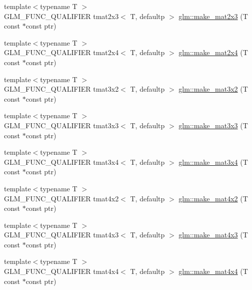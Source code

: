 \begin{DoxyCompactItemize}
\item 
{\footnotesize template$<$typename T $>$ }\\G\+L\+M\+\_\+\+F\+U\+N\+C\+\_\+\+Q\+U\+A\+L\+I\+F\+I\+ER tmat2x3$<$ T, defaultp $>$ \hyperlink{group__gtc__type__ptr_ga37988c6dd941f617cdfab86d54375fc1}{glm\+::make\+\_\+mat2x3} (T const $\ast$const ptr)
\item 
{\footnotesize template$<$typename T $>$ }\\G\+L\+M\+\_\+\+F\+U\+N\+C\+\_\+\+Q\+U\+A\+L\+I\+F\+I\+ER tmat2x4$<$ T, defaultp $>$ \hyperlink{group__gtc__type__ptr_ga6dfb2ac10859b0cc8e3893ea84fa95b5}{glm\+::make\+\_\+mat2x4} (T const $\ast$const ptr)
\item 
{\footnotesize template$<$typename T $>$ }\\G\+L\+M\+\_\+\+F\+U\+N\+C\+\_\+\+Q\+U\+A\+L\+I\+F\+I\+ER tmat3x2$<$ T, defaultp $>$ \hyperlink{group__gtc__type__ptr_gabe1e5066608a66da7a94f802b57b4eed}{glm\+::make\+\_\+mat3x2} (T const $\ast$const ptr)
\item 
{\footnotesize template$<$typename T $>$ }\\G\+L\+M\+\_\+\+F\+U\+N\+C\+\_\+\+Q\+U\+A\+L\+I\+F\+I\+ER tmat3x3$<$ T, defaultp $>$ \hyperlink{group__gtc__type__ptr_ga3cbe7adf857c867cee77eae4617abadd}{glm\+::make\+\_\+mat3x3} (T const $\ast$const ptr)
\item 
{\footnotesize template$<$typename T $>$ }\\G\+L\+M\+\_\+\+F\+U\+N\+C\+\_\+\+Q\+U\+A\+L\+I\+F\+I\+ER tmat3x4$<$ T, defaultp $>$ \hyperlink{group__gtc__type__ptr_gac083edd180ab4d4b817acc60c516209b}{glm\+::make\+\_\+mat3x4} (T const $\ast$const ptr)
\item 
{\footnotesize template$<$typename T $>$ }\\G\+L\+M\+\_\+\+F\+U\+N\+C\+\_\+\+Q\+U\+A\+L\+I\+F\+I\+ER tmat4x2$<$ T, defaultp $>$ \hyperlink{group__gtc__type__ptr_ga967a5b934e67ff9a6d1d0d27a377a264}{glm\+::make\+\_\+mat4x2} (T const $\ast$const ptr)
\item 
{\footnotesize template$<$typename T $>$ }\\G\+L\+M\+\_\+\+F\+U\+N\+C\+\_\+\+Q\+U\+A\+L\+I\+F\+I\+ER tmat4x3$<$ T, defaultp $>$ \hyperlink{group__gtc__type__ptr_ga4d42daced532b33cc672280e48670a51}{glm\+::make\+\_\+mat4x3} (T const $\ast$const ptr)
\item 
{\footnotesize template$<$typename T $>$ }\\G\+L\+M\+\_\+\+F\+U\+N\+C\+\_\+\+Q\+U\+A\+L\+I\+F\+I\+ER tmat4x4$<$ T, defaultp $>$ \hyperlink{group__gtc__type__ptr_gaf605a5f5e2ff594e8d404b2855b09541}{glm\+::make\+\_\+mat4x4} (T const $\ast$const ptr)

\end{DoxyCompactItemize}
